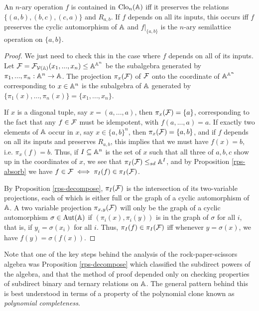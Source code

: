 \documentclass[letterpaper,11pt]{article}
\DeclareMathOperator{\Clo}{Clo}
\DeclareMathOperator{\Aut}{Aut}
\begin{document}
\begin{thm} An $n$-ary operation $f$ is contained in $\Clo_n(\bA)$ iff it preserves the relations $\{(a,b),(b,c),(c,a)\}$ and $R_{a,b}$. If $f$ depends on all its inputs, this occurs iff $f$ preserves the cyclic automorphism of $\mathbb{A}$ and $f|_{\{a,b\}}$ is the $n$-ary semilattice operation on $\{a,b\}$.
\end{thm}
\begin{proof} We just need to check this in the case where $f$ depends on all of its inputs. Let $\mathcal{F} = \mathcal{F}_{\mathcal{V}(\mathbb{A})}(x_1, ..., x_n) \le \mathbb{A}^{\mathbb{A}^n}$ be the subalgebra generated by $\pi_1, ..., \pi_n : \mathbb{A}^n \rightarrow \mathbb{A}$. The projection $\pi_x(\mathcal{F})$ of $\mathcal{F}$ onto the coordinate of $\mathbb{A}^{\mathbb{A}^n}$ corresponding to $x \in \mathbb{A}^n$ is the subalgebra of $\mathbb{A}$ generated by $\{\pi_1(x), ..., \pi_n(x)\} = \{x_1, ..., x_n\}$.

If $x$ is a diagonal tuple, say $x = (a,...,a)$, then $\pi_x(\mathcal{F}) = \{a\}$, corresponding to the fact that any $f \in \mathcal{F}$ must be idempotent, with $f(a,...,a) = a$. If exactly two elements of $\mathbb{A}$ occur in $x$, say $x \in \{a,b\}^n$, then $\pi_x(\mathcal{F}) = \{a,b\}$, and if $f$ depends on all its inputs and preserves $R_{a,b}$, this implies that we must have $f(x) = b$, i.e. $\pi_x(f) = b$. Thus, if $I \subseteq \mathbb{A}^n$ is the set of $x$ such that all three of $a,b,c$ show up in the coordinates of $x$, we see that $\pi_I(\mathcal{F}) \le_{sd} \mathbb{A}^I$, and by Proposition \ref{rps-absorb} we have $f \in \mathcal{F} \iff \pi_I(f) \in \pi_I(\mathcal{F})$.

By Proposition \ref{rps-decompose}, $\pi_I(\mathcal{F})$ is the intersection of its two-variable projections, each of which is either full or the graph of a cyclic automorphism of $\mathbb{A}$. A two variable projection $\pi_{x,y}(\mathcal{F})$ will only be the graph of a cyclic automorphism $\sigma \in \Aut(\bA)$ if $(\pi_i(x),\pi_i(y))$ is in the graph of $\sigma$ for all $i$, that is, if $y_i = \sigma(x_i)$ for all $i$. Thus, $\pi_I(f) \in \pi_I(\mathcal{F})$ iff whenever $y = \sigma(x)$, we have $f(y) = \sigma(f(x))$.
\end{proof}

Note that one of the key steps behind the analysis of the rock-paper-scissors algebra was Proposition \ref{rps-decompose} which classified the subdirect powers of the algebra, and that the method of proof depended only on checking properties of subdirect binary and ternary relations on $\mathbb{A}$. The general pattern behind this is best understood in terms of a property of the polynomial clone known as \emph{polynomial completeness}.
\end{document}
